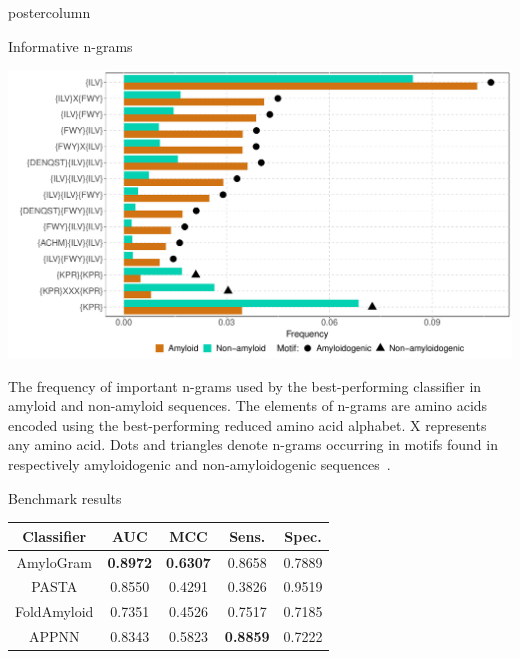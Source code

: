 \documentclass[final]{beamer}\usepackage[]{graphicx}\usepackage[]{color}
\makeatletter
\def\maxwidth{ %
  \ifdim\Gin@nat@width>\linewidth
    \linewidth
  \else
    \Gin@nat@width
  \fi
}
\newenvironment{knitrout}{}{} %
\makeatother
\begin{document}
\begin{frame}
\begin{columns}
\begin{column}{.48\textwidth}
\begin{beamercolorbox}[center,wd=\textwidth]{postercolumn}
\begin{minipage}[T]{.95\textwidth}
{\begin{block}{Informative n-grams}
\begin{knitrout}
{\centering \includegraphics[width=\maxwidth]{figure/unnamed-chunk-2-1} 

}



\end{knitrout}

The frequency of important n-grams used by the best-performing 
classifier in amyloid and non-amyloid sequences. The elements of n-grams are 
amino acids encoded using the best-performing reduced amino acid alphabet. 
X represents any amino acid. Dots and triangles 
denote n-grams occurring in motifs found in respectively amyloidogenic and 
non-amyloidogenic sequences~\citep{paz_sequence_2004}.

\end{block}
\vfill



\begin{block}{Benchmark results}

\begin{table}[ht]
\centering

\begin{tabular}{ccccc}
  \toprule
Classifier & AUC & MCC & Sens. & Spec. \\ 
  \midrule
AmyloGram & \textbf{0.8972} & \textbf{0.6307} & 0.8658 & 0.7889 \\ 
  \rowcolor{white}PASTA \citep{walsh_pasta_2014} & 0.8550 & 0.4291 & 0.3826 & 0.9519 \\ 
   FoldAmyloid \citep{garbuzynskiy_foldamyloid:_2010} & 0.7351 & 0.4526 & 0.7517 & 0.7185 \\ 
  \rowcolor{white}APPNN \citep{familia_prediction_2015} & 0.8343 & 0.5823 & \textbf{0.8859} & 0.7222 \\ 
   \bottomrule
\end{tabular}
\end{table}


\end{block}}
\end{minipage}
\end{beamercolorbox}
\end{column}
\end{columns}
\end{frame}
\end{document}
